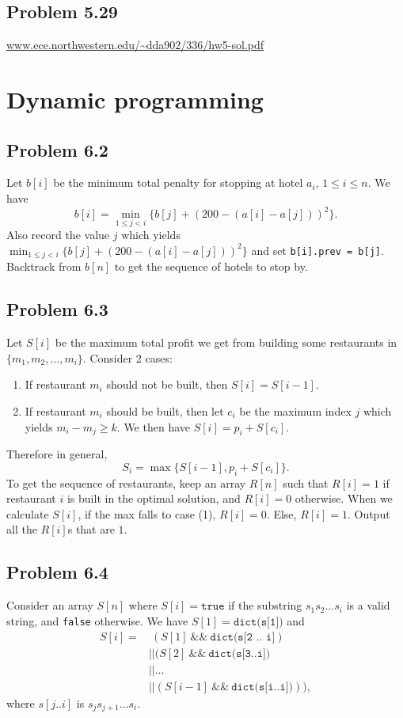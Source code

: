 \documentclass[12pt]{report}
\newcommand{\co}{\texttt}
\renewcommand{\and}{\ \&\& \ }
\begin{document}
\section{Problem 5.29}
\url{www.ece.northwestern.edu/~dda902/336/hw5-sol.pdf}

\chapter[Chapter 6 Solution]{Dynamic programming}
\section{Problem 6.2}
Let $b[i]$ be the minimum total penalty for stopping at hotel $a_i$, $1 \le i \le n$. We have $$b[i] = \min_{1 \le j < i} \{ b[j] + (200 - (a[i] - a[j]))^2\}.$$
Also record the value $j$ which yields $\displaystyle \min_{1 \le j < i} \{ b[j] + (200 - (a[i] - a[j]))^2\}$ and set \co{b[i].prev = b[j]}. Backtrack from $b[n]$ to get the sequence of hotels to stop by.


\section{Problem 6.3}
Let $S[i]$ be the maximum total profit we get from building some restaurants in $\{m_1, m_2, \ldots, m_i\}$. Consider 2 cases:
\begin{enumerate}[(1)]
  \item If restaurant $m_i$ should not be built, then $S[i] = S[i-1]$.
  \item If restaurant $m_i$ should be built, then let $c_i$ be the maximum index $j$ which yields $m_i - m_j \ge k$. We then have $\displaystyle S[i] = p_i + S[c_i]$.
\end{enumerate}
Therefore in general, $$S_i = \max \{ S[i-1], p_i + S[c_i]\}.$$
To get the sequence of restaurants, keep an array $R[n]$ such that $R[i] = 1$ if restaurant $i$ is built in the optimal solution, and $R[i] = 0$ otherwise. When we calculate $S[i]$, if the max falls to case (1), $R[i] = 0$. Else, $R[i] = 1$. Output all the $R[i]$s that are $1$.

\section{Problem 6.4}
Consider an array $S[n]$ where $S[i] = \co{true}$ if the substring $s_1 s_2 \ldots s_i$ is a valid string, and \co{false} otherwise. We have $S[1] = \co{dict(s[1])}$ and 
$$
\begin{aligned}
S[i] = & \ (S[1] \and \co{dict(s[2 .. i]}) \\ 
& || (S[2] \and \co{dict(s[3..i])} \\ 
& || \ldots \\
& || (S[i-1] \and \co{dict(s[i..i])})), 
\end{aligned}$$
where $s[j..i]$ is $s_j s_{j+1} \ldots s_i$.
\end{document}
